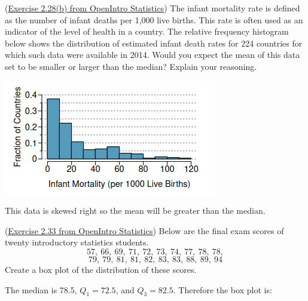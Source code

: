 \documentclass[12pt,answers]{exam}
\newcounter{countA}
\begin{document}
\begin{questions}
\setcounter{question}{\value{countA}}

\question (\href{http://people.hsc.edu/faculty-staff/blins/books/OpenIntroStats4e.pdf\#eoce.2.28}{Exercise 2.28(b) from OpenIntro Statistics}) The infant mortality rate is defined as the number of infant deaths per 1{,}000 live
births. This rate is often used as an indicator of the level of health in a country. The relative frequency
histogram below shows the distribution of estimated infant death rates for 224 countries for which such data
were available in 2014. Would you expect the mean of this data set
to be smaller or larger than the median?
Explain your reasoning.
\begin{flushright}
\includegraphics[scale=0.6]{infantMortality.png}
\end{flushright}
\begin{solution}
This data is skewed right so the mean will be greater than the median.
\end{solution}
\bigskip

\question (\href{http://people.hsc.edu/faculty-staff/blins/books/OpenIntroStats4e.pdf\#eoce.2.33}{Exercise 2.33 from OpenIntro Statistics}) Below are the final exam scores of twenty introductory statistics students.
$$57,~66,~69,~71,~72,~73,~74,~77,~78,~78,$$
$$79,~79,~81,~81,~82,~83,~83,~88,~89,~94$$
Create a box plot of the distribution of these scores.
\begin{solution}
The median is 78.5, $Q_1 = 72.5$, and $Q_3 = 82.5$.  Therefore the box plot is:

\begin{center}
\end{center}

\end{solution}
\vspace*{2.5in}

\setcounter{countA}{\value{question}}
\end{questions}
\end{document}

